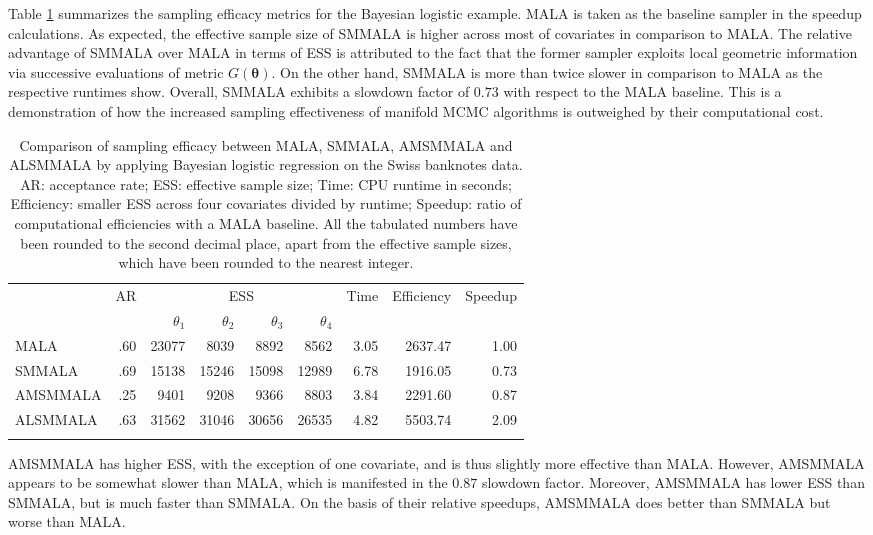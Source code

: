 \documentclass[twoside,11pt]{article}
\begin{document}
{Table \ref{tab:logit} summarizes the sampling efficacy metrics for the Bayesian logistic example. MALA is taken as the 
baseline sampler in the speedup calculations. As expected, the effective sample size of SMMALA is higher across most of 
covariates in comparison to MALA. The relative advantage of SMMALA over MALA in terms of ESS is attributed to the fact that 
the former sampler exploits local geometric information via successive evaluations of metric $G(\boldsymbol{\theta})$. On 
the other hand, SMMALA is more than twice slower in comparison to MALA as the respective runtimes show. Overall, SMMALA
exhibits a slowdown factor of $0.73$ with respect to the MALA baseline. This is a demonstration of how the increased
sampling effectiveness of manifold MCMC algorithms is outweighed by their computational cost.

\begin{table}[t]
	\centering
	\begin{tabular}{l|r|rrrr|r|r|r}
		\hline\noalign{\smallskip}
		\multirow{2}{*}{Method} &
		\multirow{2}{*}{AR} &
		\multicolumn{4}{c|}{ESS} &
		\multirow{2}{*}{Time} &
		\multirow{2}{*}{Efficiency} &
		\multirow{2}{*}{Speedup} \\
		& & $\theta_1$ & $\theta_2$ & $\theta_3$ & $\theta_4$ & & & \\
		\noalign{\smallskip}\hline\noalign{\smallskip}
		MALA & .60 & 23077 & 8039 & 8892 & 8562 & 3.05 & 2637.47 & 1.00 \\
		SMMALA & .69 & 15138 & 15246 & 15098 & 12989 & 6.78 & 1916.05 & 0.73 \\
		AMSMMALA & .25 & 9401 & 9208 & 9366 & 8803 & 3.84 & 2291.60 & 0.87 \\
	  ALSMMALA & .63 & 31562 & 31046 & 30656 & 26535 & 4.82 & 5503.74 & 2.09 \\
		\noalign{\smallskip}\hline
	\end{tabular}
	\caption{
		Comparison of sampling efficacy between MALA, SMMALA, AMSMMALA and ALSMMALA by applying Bayesian logistic regression on
		the Swiss banknotes data. AR: acceptance rate; ESS: effective sample size; Time: CPU runtime in seconds; Efficiency:
		smaller ESS across four covariates divided by runtime; Speedup: ratio of computational efficiencies with a MALA baseline.
	  All the tabulated numbers have been rounded to the second decimal place, apart from the effective sample sizes, which 
	  have been rounded to the nearest integer.
	}
	\label{tab:logit}
\end{table}

AMSMMALA has higher ESS, with the exception of one covariate, and is thus slightly more effective than MALA. However, 
AMSMMALA appears to be somewhat slower than MALA, which is manifested in the $0.87$ slowdown factor. Moreover, AMSMMALA has
lower ESS than SMMALA, but is much faster than SMMALA. On the basis of their relative speedups, AMSMMALA does better than
SMMALA but worse than MALA.

}
\end{document}
